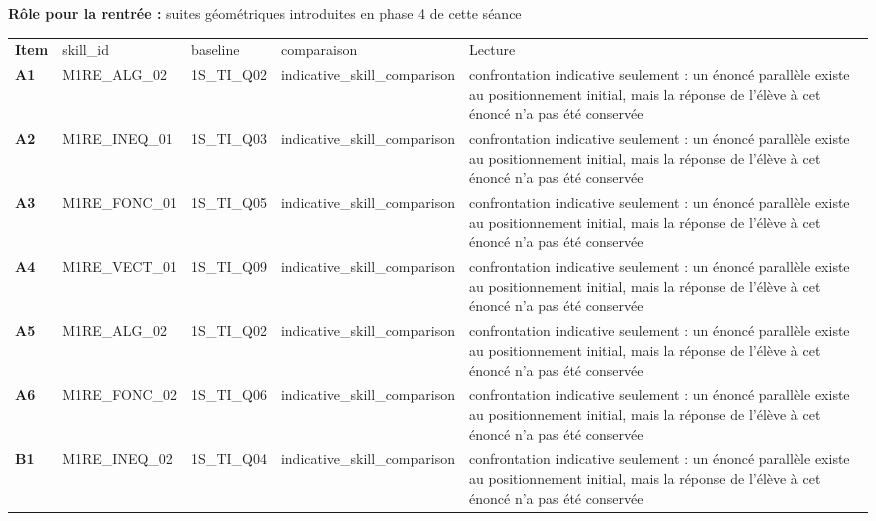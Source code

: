 \documentclass[10pt,a4paper]{article}
\begin{document}
\par\vspace{1mm}\small\textbf{Rôle pour la rentrée :} suites géométriques introduites en phase 4 de cette séance
\par\vspace{2mm}
\newpage{}
\par\noindent\begin{tabularx}{\linewidth}{>{\bfseries}p{9mm} >{\ttfamily\scriptsize}p{25mm} >{\ttfamily\scriptsize}p{22mm} >{\ttfamily\scriptsize}p{16mm} X}
\rowcolor{Navy}\color{white}Item & \color{white}\scriptsize skill\_id & \color{white}\scriptsize baseline & \color{white}\scriptsize comparaison & \color{white}Lecture \\
A1 & M1RE\_ALG\_02 & 1S\_TI\_Q02 & indicative\_skill\_comparison & confrontation indicative seulement : un énoncé parallèle existe au positionnement initial, mais la réponse de l'élève à cet énoncé n'a pas été conservée \\
A2 & M1RE\_INEQ\_01 & 1S\_TI\_Q03 & indicative\_skill\_comparison & confrontation indicative seulement : un énoncé parallèle existe au positionnement initial, mais la réponse de l'élève à cet énoncé n'a pas été conservée \\
A3 & M1RE\_FONC\_01 & 1S\_TI\_Q05 & indicative\_skill\_comparison & confrontation indicative seulement : un énoncé parallèle existe au positionnement initial, mais la réponse de l'élève à cet énoncé n'a pas été conservée \\
A4 & M1RE\_VECT\_01 & 1S\_TI\_Q09 & indicative\_skill\_comparison & confrontation indicative seulement : un énoncé parallèle existe au positionnement initial, mais la réponse de l'élève à cet énoncé n'a pas été conservée \\
A5 & M1RE\_ALG\_02 & 1S\_TI\_Q02 & indicative\_skill\_comparison & confrontation indicative seulement : un énoncé parallèle existe au positionnement initial, mais la réponse de l'élève à cet énoncé n'a pas été conservée \\
A6 & M1RE\_FONC\_02 & 1S\_TI\_Q06 & indicative\_skill\_comparison & confrontation indicative seulement : un énoncé parallèle existe au positionnement initial, mais la réponse de l'élève à cet énoncé n'a pas été conservée \\
B1 & M1RE\_INEQ\_02 & 1S\_TI\_Q04 & indicative\_skill\_comparison & confrontation indicative seulement : un énoncé parallèle existe au positionnement initial, mais la réponse de l'élève à cet énoncé n'a pas été conservée \\

\end{tabularx}
\end{document}
